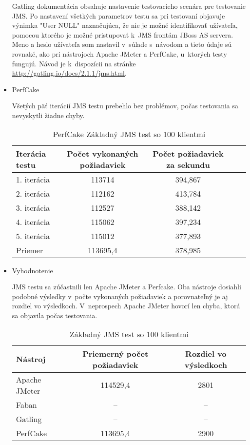 \documentclass[12pt,oneside,final]{fithesis-utf8}
\begin{document}
\begin{itemize}
Gatling dokumentácia obsahuje nastavenie testovacieho scenára pre testovanie JMS. Po nastavení všetkých parametrov testu sa pri testovaní objavuje výnimka "{}User NULL"{} naznačujúca, že nie je možné identifikovať užívateľa, pomocou ktorého je možné pristupovať k~JMS frontám JBoss AS servera. Meno a heslo užívateľa som nastavil v~súlade s~návodom a tieto údaje sú rovnaké, ako pri nástrojoch Apache JMeter a PerfCake, u~ktorých testy fungujú. Návod je k~dispozícii na stránke \url{http://gatling.io/docs/2.1.1/jms.html}.

\item PerfCake

Všetých päť iterácií JMS testu prebehlo bez problémov, počas testovania sa nevyskytli žiadne chyby.

\begin{table}[H]
\begin{center}
\begin{tabular}{ | l | c | c | c | c |}
		\hline
		 \textbf{Iterácia testu} & \textbf{Počet vykonaných požiadaviek} & \textbf{Počet požiadaviek za sekundu} \\ \hline
		 1. iterácia & 113714 & 394,867 \\ \hline
		 2. iterácia & 112162 & 413,784 \\ \hline
		 3. iterácia & 112527 & 388,142 \\ \hline
		 4. iterácia & 115062 & 397,234 \\ \hline
		 5. iterácia & 115012 & 377,893 \\ \hline
		 Priemer & 113695,4 & 378,985 \\ \hline
		 
\end{tabular}
\end{center}
\caption{PerfCake Základný JMS test so 100 klientmi}
\end{table}

\item Vyhodnotenie

JMS testu sa zúčastnili len Apache JMeter a Perfcake. Oba nástroje dosiahli podobné výsledky v~počte vykonaných požiadaviek a porovnateľný je aj rozdiel vo výsledkoch. V~neprospech Apache JMeter hovorí len chyba, ktorá sa objavila počas testovania.

\begin{table}[H]
\begin{center}
\begin{tabular}{ | l | c | c |}
		\hline
		 \textbf{Nástroj} & \textbf{Priemerný počet požiadaviek} & \textbf{Rozdiel vo výsledkoch} \\ \hline
		 Apache JMeter & 114529,4 & 2801 \\ \hline
		 Faban & -- & -- \\ \hline
		 Gatling & -- & -- \\ \hline
		 PerfCake & 113695,4 & 2900 \\ \hline
\end{tabular}
\end{center}
\caption{Základný JMS test so 100 klientmi}
\end{table}

\end{itemize}
\end{document}
